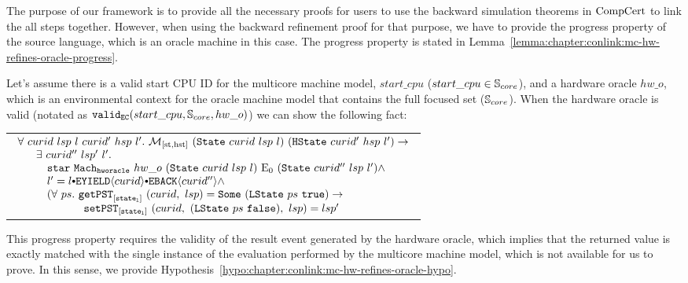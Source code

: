 The purpose of our framework is to provide all the necessary proofs
for users to use the backward simulation theorems in $\mathrm{CompCert}$ to link the all steps together. 
However, when using the backward refinement proof for that purpose, we have to provide the progress property of the 
source language, which is an oracle machine in this case. 
The progress property is stated in Lemma~\ref{lemma:chapter:conlink:mc-hw-refines-oracle-progress}.

\begin{lemma}
\label{lemma:chapter:conlink:mc-hw-refines-oracle-progress}

Let's assume  there is a valid start CPU ID for the multicore machine model, 
$start\_cpu$ ($start\_cpu \in {\mathbb{S}_{core}}$), and a hardware oracle $hw\_o$,  
which is an environmental context for the oracle machine model that contains the full focused set (${\mathbb{S}_{core}}$).
When the hardware oracle is valid (notated as $ {{\mathrm{\texttt{valid}}}_{{\mathrm{\texttt{EC}}}}}({start\_cpu}, {{\mathbb{S}_{core}}}, {hw\_o})$) we can show the following fact:
\begin{center}
\begin{tabular}{P{0.95\textwidth}}
$
\begin{array}{l}
\forall \ curid \ lsp \ l \ curid' \ hsp \ l' . \ \matchstatehstate{(\mcstate{curid}{lsp}{l})}{(\hstate{curid'}{hsp}{l'})} \rightarrow \\
\ \ \ \ \  \exists \ curid'' \ lsp' \ l'  . \ \\
\ \ \ \ \   \ \ \ \ccstarstep{\oraclestep{hw\_o}{(\mcstate{curid}{lsp}{l})}{\ccemptytrace}{(\mcstate{curid''}{lsp}{l'})}} \wedge\\
\ \ \ \ \   \ \ \ l' = \listconsoppo{\yieldbackev{curid''}}{\listconsoppo{\yieldev{curid}}{l}} \wedge\\
\ \ \ \ \   \ \ \ (\forall \ ps  . \ \getpstsome{\localstatekwd}{curid}{lsp}{(\localstate{ps}{\btrue})} \rightarrow \\
\ \ \ \ \    \ \ \ \ \ \ \ \ \ \ \ \ \ \setpst{\localstatekwd}{curid}{(\localstate{ps}{\bfalse})}{lsp}{lsp'} \\
\end{array}
$
\end{tabular}
\end{center}
\end{lemma}
This progress property requires the validity of the result event generated by the hardware oracle, which implies
that the returned value is exactly matched with the single instance of the evaluation performed 
by the multicore machine model, which is not available for us to prove. 
In this sense, we  provide Hypothesis~\ref{hypo:chapter:conlink:mc-hw-refines-oracle-hypo}.

